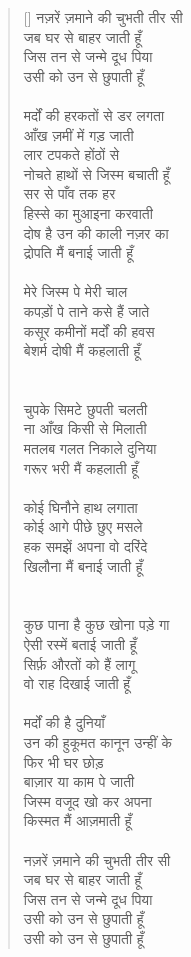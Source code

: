 \begin{verse}[\versewidth]\texthindi{
नज़रें ज़माने की चुभती तीर सी\\
जब घर से बाहर जाती हूँ\\
जिस तन से जन्मे दूध पिया\\
उसी को उन से छुपाती हूँ\\
\\
मर्दों की हरकतों से डर लगता\\
आँख ज़मीं में गड़ जाती\\
लार टपकते होंठों से\\
नोचते हाथों से जिस्म बचाती हूँ\\
सर से पाँव तक हर\\
हिस्से का मुआइना करवाती\\
दोष है उन की काली नज़र का\\
द्रोपति मैं बनाई जाती हूँ\\
\\
मेरे जिस्म पे मेरी चाल\\
कपड़ों पे ताने कसे हैं जाते\\
कसूर कमीनों मर्दों की हवस\\
बेशर्म दोषी मैं कहलाती हूँ\\
\\
\\
चुपके सिमटे छुपती चलती\\
ना आँख किसी से मिलाती\\
मतलब गलत निकाले दुनिया\\
गरूर भरी मैं कहलाती हूँ\\
\\
कोई घिनौने हाथ लगाता\\
कोई आगे पीछे छुए मसले\\
हक समझें अपना वो दरिंदे\\
खिलौना मैं बनाई जाती हूँ\\
\\
\\
कुछ पाना है कुछ खोना पड़े गा\\
ऐसी रस्में बताई जाती हूँ \\
सिर्फ़ औरतों को हैं लागू\\
वो राह दिखाई जाती हूँ\\
\\
मर्दों की है दुनियाँ\\
उन की हुकूमत कानून उन्हीं के\\
फिर भी घर छोड़\\
बाज़ार या काम पे जाती\\
जिस्म वजूद खो कर अपना\\
किस्मत मैं आज़माती हूँ\\
\\
नज़रें ज़माने की चुभती तीर सी\\
जब घर से बाहर जाती हूँ\\
जिस तन से जन्मे दूध पिया\\
उसी को उन से छुपाती हूँ\\
उसी को उन से छुपाती हूँ
}\end{verse}

